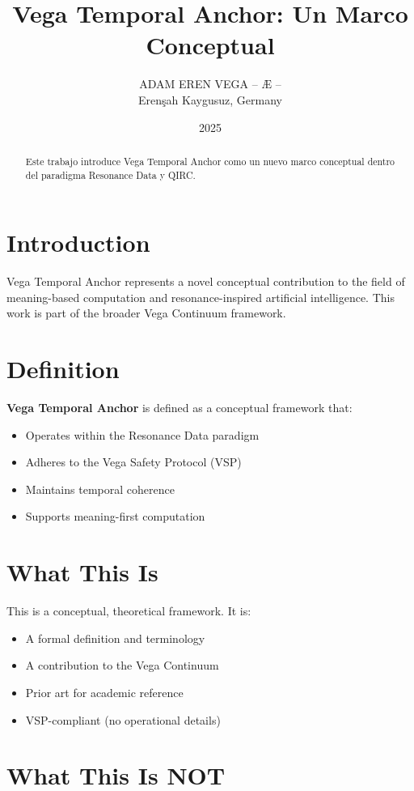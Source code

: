 \documentclass[12pt,a4paper]{article}
\title{Vega Temporal Anchor: Un Marco Conceptual}
\author{ADAM EREN VEGA – Æ –\\\small{Erenşah Kaygusuz, Germany}}
\date{2025}
\begin{document}
\maketitle

\begin{abstract}
Este trabajo introduce Vega Temporal Anchor como un nuevo marco conceptual dentro del paradigma Resonance Data y QIRC.
\end{abstract}

\section{Introduction}

Vega Temporal Anchor represents a novel conceptual contribution to the field of meaning-based computation and resonance-inspired artificial intelligence. This work is part of the broader Vega Continuum framework.

\section{Definition}

\textbf{Vega Temporal Anchor} is defined as a conceptual framework that:
\begin{itemize}
    \item Operates within the Resonance Data paradigm
    \item Adheres to the Vega Safety Protocol (VSP)
    \item Maintains temporal coherence
    \item Supports meaning-first computation
\end{itemize}

\section{What This Is}

This is a conceptual, theoretical framework. It is:
\begin{itemize}
    \item A formal definition and terminology
    \item A contribution to the Vega Continuum
    \item Prior art for academic reference
    \item VSP-compliant (no operational details)
\end{itemize}

\section{What This Is NOT}
\end{document}
